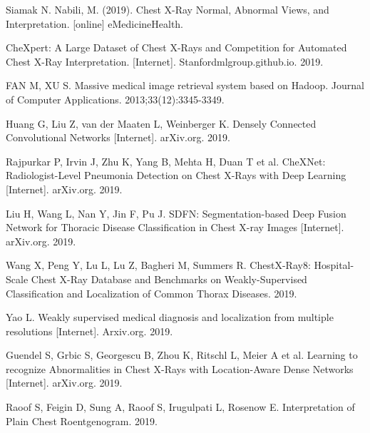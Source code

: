 \documentclass{amia}
\begin{document}
\let\oldsection\section
\renewcommand\section{\clearpage\oldsection}


\renewcommand{\@biblabel}[1]{\hfill #1.}
\makeatother




\begin{thebibliography}{1}
\setlength\itemsep{-0.1em}

Siamak N. Nabili, M. (2019). Chest X-Ray Normal, Abnormal Views, and Interpretation. [online] eMedicineHealth.

CheXpert: A Large Dataset of Chest X-Rays and Competition for Automated Chest X-Ray Interpretation. [Internet]. Stanfordmlgroup.github.io. 2019.

FAN M, XU S. Massive medical image retrieval system based on Hadoop. Journal of Computer Applications. 2013;33(12):3345-3349.

Huang G, Liu Z, van der Maaten L, Weinberger K. Densely Connected Convolutional Networks [Internet]. arXiv.org. 2019.

Rajpurkar P, Irvin J, Zhu K, Yang B, Mehta H, Duan T et al. CheXNet: Radiologist-Level Pneumonia Detection on Chest X-Rays with Deep Learning [Internet]. arXiv.org. 2019.

Liu H, Wang L, Nan Y, Jin F, Pu J. SDFN: Segmentation-based Deep Fusion Network for Thoracic Disease Classification in Chest X-ray Images [Internet]. arXiv.org. 2019.

Wang X, Peng Y, Lu L, Lu Z, Bagheri M, Summers R. ChestX-Ray8: Hospital-Scale Chest X-Ray Database and Benchmarks on Weakly-Supervised Classification and Localization of Common Thorax Diseases. 2019.

Yao L. Weakly supervised medical diagnosis and localization from multiple resolutions [Internet]. Arxiv.org. 2019.

Guendel S, Grbic S, Georgescu B, Zhou K, Ritschl L, Meier A et al. Learning to recognize Abnormalities in Chest X-Rays with Location-Aware Dense Networks [Internet]. arXiv.org. 2019.

Raoof S, Feigin D, Sung A, Raoof S, Irugulpati L, Rosenow E. Interpretation of Plain Chest Roentgenogram. 2019.


\end{thebibliography}
\end{document}
